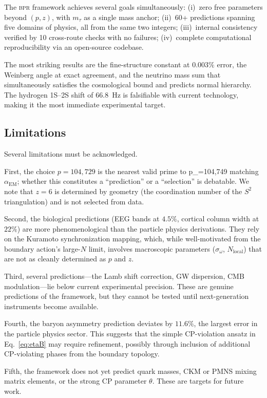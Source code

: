 \documentclass[aps,prd,twocolumn,superscriptaddress,longbibliography,nofootinbib]{revtex4-2}
\newcommand{\Stwo}{S^2}
\newcommand{\alphaEM}{\alpha_{\mathrm{EM}}}
\newcommand{\bpr}{\textsc{bpr}}
\begin{document}
The \bpr{} framework achieves several goals simultaneously:
(i)~zero free parameters beyond $(p, z)$, with $m_\tau$ as a single
mass anchor; (ii)~60+ predictions spanning five domains of physics,
all from the same two integers; (iii)~internal consistency verified
by 10 cross-route checks with no failures; (iv)~complete
computational reproducibility via an open-source codebase.

The most striking results are the fine-structure constant at
$0.003\%$ error, the Weinberg angle at exact agreement, and the
neutrino mass sum that simultaneously satisfies the cosmological
bound and predicts normal hierarchy.  The hydrogen 1S--2S shift of
66.8~Hz is falsifiable with current technology, making it the most
immediate experimental target.

\subsection{Limitations}

Several limitations must be acknowledged.

First, the choice $p = 104{,}729$ is the nearest valid prime to p_=104{,}749 matching
$\alphaEM$; whether this constitutes a ``prediction'' or a
``selection'' is debatable.  We note that $z = 6$ is determined by
geometry (the coordination number of the $\Stwo$ triangulation) and
is not selected from data.

Second, the biological predictions (EEG bands at $4.5\%$, cortical
column width at $22\%$) are more phenomenological than the particle
physics derivations.  They rely on the Kuramoto synchronization
mapping, which, while well-motivated from the boundary action's
large-$N$ limit, involves macroscopic parameters
($\sigma_\omega$, $N_{\mathrm{local}}$) that are not as cleanly
determined as $p$ and $z$.

Third, several predictions---the Lamb shift correction, GW
dispersion, CMB modulation---lie below current experimental
precision.  These are genuine predictions of the framework, but
they cannot be tested until next-generation instruments become
available.

Fourth, the baryon asymmetry prediction deviates by $11.6\%$,
the largest error in the particle physics sector.  This suggests
that the simple CP-violation ansatz in
Eq.~\eqref{eq:etaB} may require refinement, possibly through
inclusion of additional CP-violating phases from the boundary
topology.

Fifth, the framework does not yet predict quark masses, CKM or PMNS
mixing matrix elements, or the strong CP parameter $\theta$.  These
are targets for future work.
\end{document}
